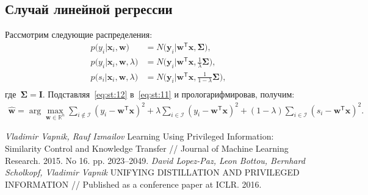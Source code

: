 \documentclass[12pt, twoside]{article}
\numberwithin{equation}{section}
\begin{document}
\subsection{Случай линейной регрессии}
Рассмотрим следующие распределения:
\[
\label{eq:st:12}
\begin{aligned}
p\bigr(y_i|\textbf{x}_i, \textbf{w}\bigr) &= N\bigr(\textbf{y}_i|\textbf{w}^{\mathsf{T}}\textbf{x}, \bm{\Sigma}\bigr), \\
p\bigr(y_i|\textbf{x}_i, \textbf{w}, \lambda\bigr) &= N\bigr(\textbf{y}_i|\textbf{w}^{\mathsf{T}}\textbf{x}, \frac{1}{\lambda}\bm{\Sigma}\bigr), \\
p\bigr(s_i|\textbf{x}_i, \textbf{w}, \lambda\bigr) &= N\bigr(\textbf{y}_i|\textbf{w}^{\mathsf{T}}\textbf{x},  \frac{1}{1-\lambda}\bm{\Sigma}\bigr), \\
\end{aligned}
\]
где~$\bm{\Sigma} = \textbf{I}$.
Подставляя~\eqref{eq:st:12} в~\eqref{eq:st:11} и прологарифмировав, получим:
\[
\label{eq:st:11}
\begin{aligned}
\hat{\textbf{w}} = \arg\max_{\textbf{w}\in \mathbb{R}^{n}}\sum_{i\not\in \mathcal{I}}\left(y_i-\textbf{w}^{\mathsf{T}}\textbf{x}\right)^{2}+\lambda\sum_{i\in \mathcal{I}}\left(y_i-\textbf{w}^{\mathsf{T}}\textbf{x}\right)^{2}+\left(1-\lambda\right)\sum_{i\in \mathcal{I}}\left(s_i-\textbf{w}^{\mathsf{T}}\textbf{x}\right)^{2}.
\end{aligned}
\]


\begin{thebibliography}{99}
	\textit{Vladimir Vapnik, Rauf Izmailov} Learning Using Privileged Information: Similarity Control and Knowledge Transfer // Journal of Machine Learning Research. 2015. No 16. pp. 2023--2049.
	\textit{David Lopez-Paz, Leon Bottou, Bernhard Scholkopf, Vladimir Vapnik} UNIFYING DISTILLATION
AND PRIVILEGED INFORMATION // Published as a conference paper at ICLR. 2016.
 \end{thebibliography}
\end{document}
